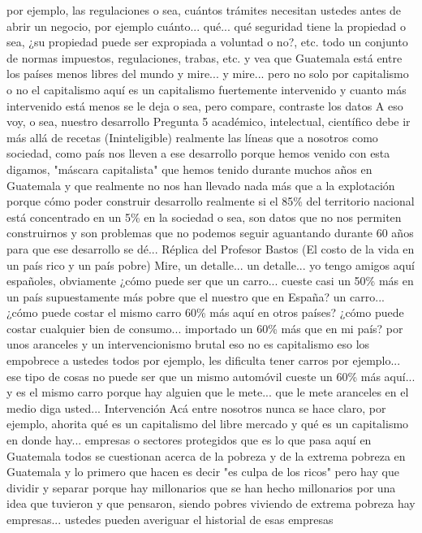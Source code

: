 por ejemplo, las regulaciones o sea, cuántos trámites necesitan ustedes antes de abrir un negocio, por ejemplo
cuánto... qué... qué seguridad tiene la propiedad o sea, ¿su propiedad puede ser expropiada a voluntad o no?, etc.
todo un conjunto de normas impuestos, regulaciones, trabas, etc. y vea que Guatemala
está entre los países menos libres del mundo y mire... y mire... pero no solo por capitalismo o no
el capitalismo aquí es un capitalismo fuertemente intervenido y cuanto más intervenido está menos se le deja
o sea, pero compare, contraste los datos A eso voy, o sea, nuestro desarrollo
Pregunta 5
académico, intelectual, científico debe ir más allá de recetas (Ininteligible)
realmente las líneas que a nosotros como sociedad, como país nos lleven a ese desarrollo
porque hemos venido con esta digamos, "máscara capitalista" que hemos tenido durante muchos años en Guatemala
y que realmente no nos han llevado nada más que a la explotación porque cómo poder construir desarrollo realmente si
el 85\% del territorio nacional está concentrado en un 5\% en la sociedad o sea, son datos que no nos permiten construirnos
y son problemas que no podemos seguir aguantando durante 60 años para que ese desarrollo se dé...
Réplica del Profesor Bastos (El costo de la vida en un país rico y un país pobre)
Mire, un detalle... un detalle... yo tengo amigos aquí españoles, obviamente
¿cómo puede ser que un carro... cueste casi un 50\% más en un país supuestamente más pobre
que el nuestro que en España? un carro... ¿cómo puede costar el mismo carro
60\% más aquí en otros países? ¿cómo puede costar cualquier bien de consumo... importado un 60\% más que en mi país?
por unos aranceles y un intervencionismo brutal eso no es capitalismo eso los empobrece a ustedes todos por ejemplo, les dificulta tener carros
por ejemplo... ese tipo de cosas no puede ser que un mismo automóvil cueste un 60\% más aquí...
y es el mismo carro porque hay alguien que le mete... que le mete aranceles en el medio diga usted...
Intervención
Acá entre nosotros nunca se hace claro, por ejemplo, ahorita qué es un capitalismo del libre mercado
y qué es un capitalismo en donde hay... empresas o sectores protegidos que es lo que pasa aquí en Guatemala
todos se cuestionan acerca de la pobreza y de la extrema pobreza en Guatemala y lo primero que hacen es decir
"es culpa de los ricos" pero hay que dividir y separar porque hay millonarios
que se han hecho millonarios por una idea que tuvieron y que pensaron, siendo pobres
viviendo de extrema pobreza hay empresas... ustedes pueden averiguar el historial de esas empresas

